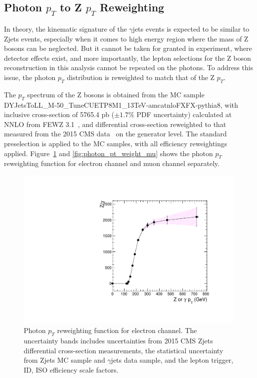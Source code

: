 \subsection{Photon $p_T$ to Z $p_T$ Reweighting}
In theory, the kinematic signature of the $\gamma$jets events is expected to be similar to Zjets events, especially when it comes to high energy region where the mass of Z bosons can be neglected. But it cannot be taken for granted in experiment, where detector effects exist, and more importantly, the lepton selections for the Z boson reconstruction in this analysis cannot be repeated on the photons. To address this issue, the photon $p_T$ distribution is reweighted to match that of the Z $p_T$. 

\vspace{0.3cm}
The $p_T$ spectrum of the Z bosons is obtained from the MC sample DYJetsToLL\_M-50\_TuneCUETP8M1\_13TeV-amcatnloFXFX-pythia8, with inclusive cross-section of 5765.4 pb ($\pm 1.7\%$ PDF uncertainty) calculated at NNLO from FEWZ 3.1~\cite{bg_fewz}, and differential cross-section reweighted to that measured from the 2015 CMS data~\cite{bg_2015zjetxsec} on the generator level. The standard preselection is applied to the MC samples, with all efficiency reweightings applied. Figure~\ref{fig:photon_pt_weight_el} and \ref{fig:photon_pt_weight_mu} shows the photon $p_T$ reweighting function for electron channel and muon channel separately. 

\begin{figure}[htbp]
\centering
  \includegraphics[width=0.9\linewidth]{figures/study_gjets_data_allcorV2_modify_el.pdf}
  \caption{Photon $p_T$ reweighting function for electron channel.
 The uncertainty bands includes uncertainties from 2015 CMS Zjets differential cross-section measurements, the statistical uncertainty from Zjets MC sample and $\gamma$jets data sample, and the lepton trigger, ID, ISO efficiency scale factors.}
  \label{fig:photon_pt_weight_el}
\end{figure}

